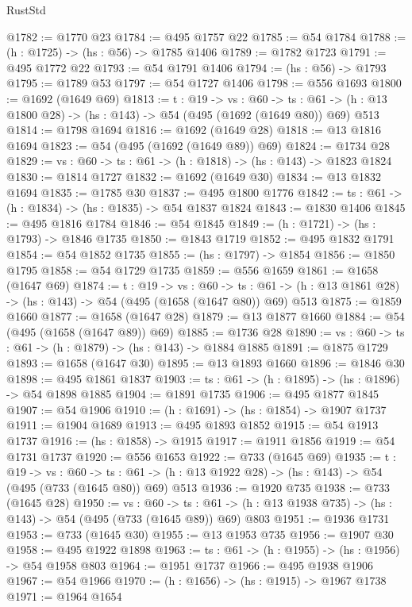 \begin{lexlean}{RustStd}
\begin{coremodule}
@1782 := @1770 @23
@1784 := @495 @1757 @22
@1785 := @54 @1784
@1788 := (h : @1725) -> (hs : @56) -> @1785 @1406
@1789 := @1782 @1723
@1791 := @495 @1772 @22
@1793 := @54 @1791 @1406
@1794 := (hs : @56) -> @1793
@1795 := @1789 @53
@1797 := @54 @1727 @1406
@1798 := @556 @1693
@1800 := @1692 (@1649 @69)
@1813 := {t : @19} ->
  {vs : @60} ->
  {ts : @61} -> (h : @13 @1800 @28) -> (hs : @143) -> @54 (@495 (@1692 (@1649 @80)) @69) @513
@1814 := @1798 @1694
@1816 := @1692 (@1649 @28)
@1818 := @13 @1816 @1694
@1823 := @54 (@495 (@1692 (@1649 @89)) @69)
@1824 := @1734 @28
@1829 := {vs : @60} -> {ts : @61} -> (h : @1818) -> (hs : @143) -> @1823 @1824
@1830 := @1814 @1727
@1832 := @1692 (@1649 @30)
@1834 := @13 @1832 @1694
@1835 := @1785 @30
@1837 := @495 @1800 @1776
@1842 := {ts : @61} -> (h : @1834) -> (hs : @1835) -> @54 @1837 @1824
@1843 := @1830 @1406
@1845 := @495 @1816 @1784
@1846 := @54 @1845
@1849 := (h : @1721) -> (hs : @1793) -> @1846 @1735
@1850 := @1843 @1719
@1852 := @495 @1832 @1791
@1854 := @54 @1852 @1735
@1855 := (hs : @1797) -> @1854
@1856 := @1850 @1795
@1858 := @54 @1729 @1735
@1859 := @556 @1659
@1861 := @1658 (@1647 @69)
@1874 := {t : @19} ->
  {vs : @60} ->
  {ts : @61} -> (h : @13 @1861 @28) -> (hs : @143) -> @54 (@495 (@1658 (@1647 @80)) @69) @513
@1875 := @1859 @1660
@1877 := @1658 (@1647 @28)
@1879 := @13 @1877 @1660
@1884 := @54 (@495 (@1658 (@1647 @89)) @69)
@1885 := @1736 @28
@1890 := {vs : @60} -> {ts : @61} -> (h : @1879) -> (hs : @143) -> @1884 @1885
@1891 := @1875 @1729
@1893 := @1658 (@1647 @30)
@1895 := @13 @1893 @1660
@1896 := @1846 @30
@1898 := @495 @1861 @1837
@1903 := {ts : @61} -> (h : @1895) -> (hs : @1896) -> @54 @1898 @1885
@1904 := @1891 @1735
@1906 := @495 @1877 @1845
@1907 := @54 @1906
@1910 := (h : @1691) -> (hs : @1854) -> @1907 @1737
@1911 := @1904 @1689
@1913 := @495 @1893 @1852
@1915 := @54 @1913 @1737
@1916 := (hs : @1858) -> @1915
@1917 := @1911 @1856
@1919 := @54 @1731 @1737
@1920 := @556 @1653
@1922 := @733 (@1645 @69)
@1935 := {t : @19} ->
  {vs : @60} ->
  {ts : @61} -> (h : @13 @1922 @28) -> (hs : @143) -> @54 (@495 (@733 (@1645 @80)) @69) @513
@1936 := @1920 @735
@1938 := @733 (@1645 @28)
@1950 := {vs : @60} ->
  {ts : @61} -> (h : @13 @1938 @735) -> (hs : @143) -> @54 (@495 (@733 (@1645 @89)) @69) @803
@1951 := @1936 @1731
@1953 := @733 (@1645 @30)
@1955 := @13 @1953 @735
@1956 := @1907 @30
@1958 := @495 @1922 @1898
@1963 := {ts : @61} -> (h : @1955) -> (hs : @1956) -> @54 @1958 @803
@1964 := @1951 @1737
@1966 := @495 @1938 @1906
@1967 := @54 @1966
@1970 := (h : @1656) -> (hs : @1915) -> @1967 @1738
@1971 := @1964 @1654

\end{coremodule}
\end{lexlean}
